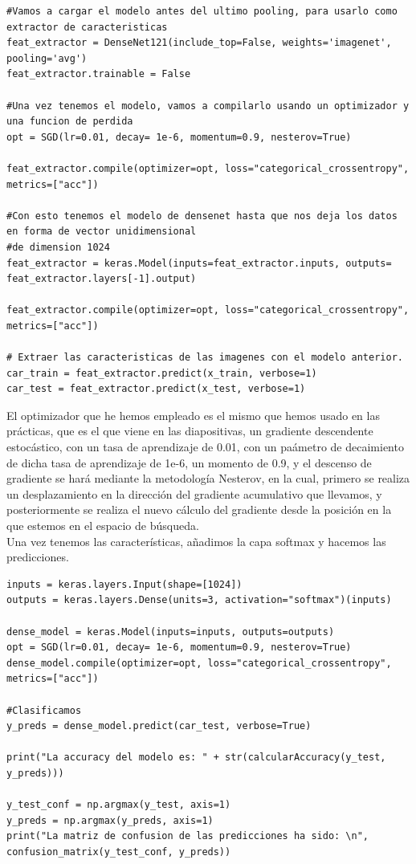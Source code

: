 \documentclass[11pt,a4paper]{article}
\theoremstyle{definition}
\begin{document}
\begin{lstlisting}
#Vamos a cargar el modelo antes del ultimo pooling, para usarlo como extractor de caracteristicas
feat_extractor = DenseNet121(include_top=False, weights='imagenet', pooling='avg')
feat_extractor.trainable = False

#Una vez tenemos el modelo, vamos a compilarlo usando un optimizador y una funcion de perdida
opt = SGD(lr=0.01, decay= 1e-6, momentum=0.9, nesterov=True)

feat_extractor.compile(optimizer=opt, loss="categorical_crossentropy", metrics=["acc"])

#Con esto tenemos el modelo de densenet hasta que nos deja los datos en forma de vector unidimensional
#de dimension 1024
feat_extractor = keras.Model(inputs=feat_extractor.inputs, outputs= feat_extractor.layers[-1].output)

feat_extractor.compile(optimizer=opt, loss="categorical_crossentropy", metrics=["acc"])

# Extraer las caracteristicas de las imagenes con el modelo anterior.
car_train = feat_extractor.predict(x_train, verbose=1)
car_test = feat_extractor.predict(x_test, verbose=1)
\end{lstlisting}

El optimizador que he hemos empleado es el mismo que hemos usado en las prácticas, que es el que viene en las diapositivas, un gradiente descendente estocástico, con un tasa de aprendizaje de 0.01, con un paámetro de decaimiento de dicha tasa de aprendizaje de 1e-6, un momento de 0.9, y el descenso de gradiente se hará mediante la metodología Nesterov, en la cual, primero se realiza un desplazamiento en la dirección del gradiente acumulativo que llevamos, y posteriormente se realiza el nuevo cálculo del gradiente desde la posición en la que estemos en el espacio de búsqueda.\\

Una vez tenemos las características, añadimos la capa softmax y hacemos las predicciones.

\begin{lstlisting}
inputs = keras.layers.Input(shape=[1024])
outputs = keras.layers.Dense(units=3, activation="softmax")(inputs)

dense_model = keras.Model(inputs=inputs, outputs=outputs)
opt = SGD(lr=0.01, decay= 1e-6, momentum=0.9, nesterov=True)
dense_model.compile(optimizer=opt, loss="categorical_crossentropy", metrics=["acc"])

#Clasificamos
y_preds = dense_model.predict(car_test, verbose=True)

print("La accuracy del modelo es: " + str(calcularAccuracy(y_test, y_preds)))

y_test_conf = np.argmax(y_test, axis=1)
y_preds = np.argmax(y_preds, axis=1)
print("La matriz de confusion de las predicciones ha sido: \n", confusion_matrix(y_test_conf, y_preds))
\end{lstlisting}
\end{document}
